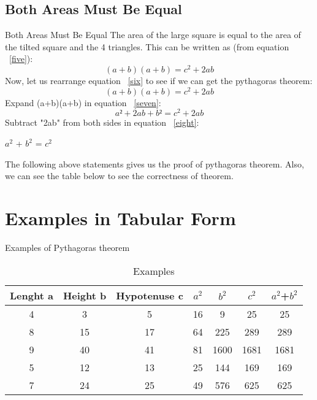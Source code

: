 \documentclass[10pt]{beamer}
\begin{document}
\subsection{Both Areas Must Be Equal}
\label{a_equal}
\begin{frame}{Both Areas Must Be Equal}
The area of the large square is equal to the area of the tilted square and the 4 triangles. This can be written as (from equation ~\ref{five}):\newline
\begin{equation}
\label{six}
(a+b)(a+b) = c^2 +2ab
\end{equation}
Now, let us rearrange equation ~\ref{six} to see if we can get the pythagoras theorem:
\begin{equation}
\label{seven}
(a+b)(a+b)	=	c^2 + 2ab
\end{equation}
Expand (a+b)(a+b) in equation ~\ref{seven}:
\begin{equation}
\label{eight}
a² + 2ab + b²	=	c^2 + 2ab
\end{equation}
Subtract "2ab" from both sides in equation ~\ref{eight}:\newline	 
\centerline {$a^2$ + $b^2$	=	$c^2$}\newline

The following above statements gives us the proof of pythagoras theorem. Also, we can see the table below to see the correctness of theorem.
\end{frame}

\section{Examples in Tabular Form}
\begin{frame}{Examples of Pythagoras theorem}
\begin{table}[bht]%
	\begin{center}
		\begin{tabular}{c c c c c c c}
			\hline\hline
			Lenght a & Height b & Hypotenuse c & $a^2$ & $b^2$ & $c^2$ & $a^2$+$b^2$    \\
			\hline
			\hline
			4 & 3 & 5 & 16 & 9 & 25 & 25 \\
			8 & 15 & 17 & 64 & 225 & 289 & 289\\
			9 & 40 & 41 & 81 & 1600 & 1681 & 1681\\
			5 & 12 & 13 & 25 & 144 & 169 & 169 \\
			7 & 24 & 25 & 49 & 576 & 625 & 625\\
			\hline
		\end{tabular}
		\caption{Examples}
		\label{sec:examp}
	\end{center}
\end{table}
\end{frame}
\end{document}
